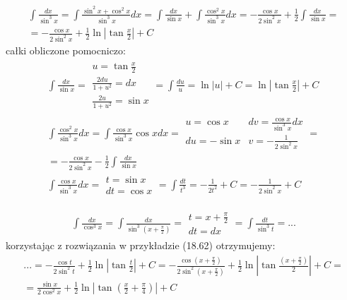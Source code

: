 \begin{gather*}\int \frac{dx}{\sin^3 x} = \int \frac{\sin^2 x+\cos^2 x}{\sin^3 x}dx = \int \frac{dx}{\sin x}+\int \frac{\cos^2 x}{\sin^3 x}dx = -\frac{\cos x}{2\sin^2 x} + \frac{1}{2}\int \frac{dx}{\sin x} =  \\
= -\frac{\cos x}{2\sin^2 x} + \frac{1}{2}\ln|\tan\frac{x}{2}|+C\end{gather*}
całki obliczone pomocniczo:
\begin{gather*}\int \frac{dx}{\sin x} = \begin{array}{|l|} u=\tan \frac{x}{2} \\ \frac{2du}{1+u^2}=dx \\ \frac{2u}{1+u^2}=\sin x \end{array} = \int \frac{du}{u} = \ln|u|+C = \ln|\tan \frac{x}{2}|+C \\
\int \frac{\cos^2 x}{\sin^3 x}dx = \int \frac{\cos x}{\sin^3 x}\cos x dx = \begin{array}{|ll|}
u=\cos x & dv=\frac{\cos x}{\sin^3 x}dx \\
du=-\sin x & v= -\frac{1}{2\sin^2 x} \end{array} =  \\
= -\frac{\cos x}{2\sin^2 x} - \frac{1}{2}\int \frac{dx}{\sin x} \\
\int \frac{\cos x}{\sin^3 x}dx = \begin{array}{|l|} t=\sin x \\ dt=\cos x \end{array} = \int \frac{dt}{t^3} = -\frac{1}{2t^2}+C = -\frac{1}{2\sin^2 x}+C\end{gather*}




\begin{gather*}\int \frac{dx}{\cos^3 x} = \int \frac{dx}{\sin^3(x+\frac{\pi}{2})} = \begin{array}{|l|} t=x+\frac{\pi}{2} \\ dt=dx \end{array} = \int \frac{dt}{\sin^3 t}=...\end{gather*}
korzystając z rozwiązania w przykładzie (18.62) otrzymujemy:
\begin{gather*}\nonumber ...= -\frac{\cos t}{2\sin^2 t} + \frac{1}{2}\ln|\tan\frac{t}{2}|+C = -\frac{\cos (x+\frac{\pi}{2})}{2\sin^2 (x+\frac{\pi}{2})} + \frac{1}{2}\ln|\tan\frac{(x+\frac{\pi}{2})}{2}|+C =  \\
= \frac{\sin x}{2\cos^2 x} + \frac{1}{2}\ln|\tan(\frac{x}{2}+\frac{\pi}{4})|+C\end{gather*}


